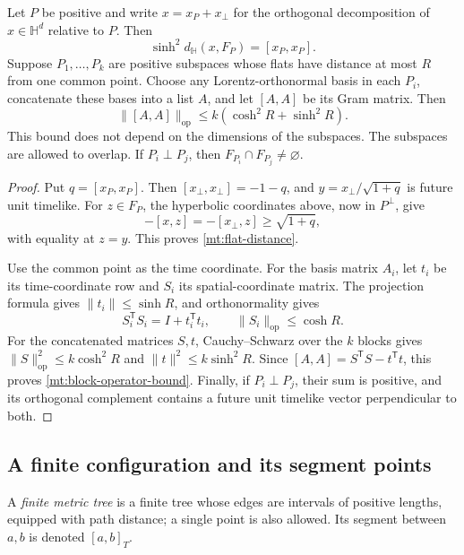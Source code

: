 \begin{lemma}\label{mt:flat-normalization}
Let \(P\) be positive and write \(x=x_P+x_\perp\) for the orthogonal
decomposition of \(x\in\mathbb H^d\) relative to \(P\).  Then
\begin{equation}\label{mt:flat-distance}
 \sinh^2 d_{\mathbb H}(x,F_P)=[x_P,x_P].
\end{equation}
Suppose \(P_1,\ldots,P_k\) are positive subspaces whose flats have
distance at most \(R\) from one common point.  Choose any
Lorentz-orthonormal basis in each \(P_i\), concatenate these bases into
a list \(A\), and let \([A,A]\) be its Gram matrix.  Then
\begin{equation}\label{mt:block-operator-bound}
 \|[A,A]\|_{\mathrm{op}}
 \le k(\cosh^2R+\sinh^2R).
\end{equation}
This bound does not depend on the dimensions of the subspaces.  The
subspaces are allowed to overlap.  If \(P_i\perp P_j\), then
\(F_{P_i}\cap F_{P_j}\ne\varnothing\).
\end{lemma}
\begin{proof}
Put \(q=[x_P,x_P]\).  Then \([x_\perp,x_\perp]=-1-q\), and
\(y=x_\perp/\sqrt{1+q}\) is future unit timelike.  For \(z\in F_P\),
the hyperbolic coordinates above, now in \(P^\perp\), give
\[
 -[x,z]=-[x_\perp,z]\ge\sqrt{1+q},
\]
with equality at \(z=y\).  This proves \eqref{mt:flat-distance}.

Use the common point as the time coordinate.  For the basis matrix
\(A_i\), let \(t_i\) be its time-coordinate row and \(S_i\) its
spatial-coordinate matrix.  The projection formula gives
\(\|t_i\|\le\sinh R\), and orthonormality gives
\[
 S_i^{\mathsf T}S_i=I+t_i^{\mathsf T}t_i,
 \qquad \|S_i\|_{\mathrm{op}}\le\cosh R.
\]
For the concatenated matrices \(S,t\), Cauchy--Schwarz over the \(k\)
blocks gives \(\|S\|_{\mathrm{op}}^2\le k\cosh^2R\) and
\(\|t\|^2\le k\sinh^2R\).  Since
\([A,A]=S^{\mathsf T}S-t^{\mathsf T}t\), this proves
\eqref{mt:block-operator-bound}.  Finally, if \(P_i\perp P_j\), their
sum is positive, and its orthogonal complement contains a future unit
timelike vector perpendicular to both.
\end{proof}

\subsection{A finite configuration and its segment points}

A \emph{finite metric tree} is a finite tree whose edges are intervals
of positive lengths, equipped with path distance; a single point is
also allowed.  Its segment between \(a,b\) is denoted \([a,b]_T\).

